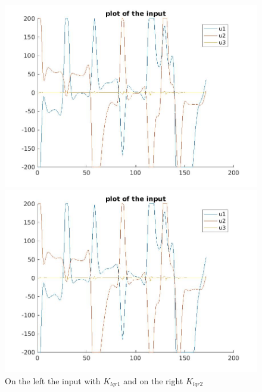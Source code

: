 \documentclass[•]{article}
\begin{document}
\begin{figure}[H]
\begin{minipage}{.45\textwidth}
\includegraphics[width = \textwidth]{lqr1input.jpg}
\end{minipage}
\begin{minipage}{.45\textwidth}
\includegraphics[width = \textwidth]{lqr2input.jpg}
\end{minipage}
\caption{On the left the input with $K_{lqr1}$ and on the right $K_{lqr2}$ }
\end{figure}
\end{document}
